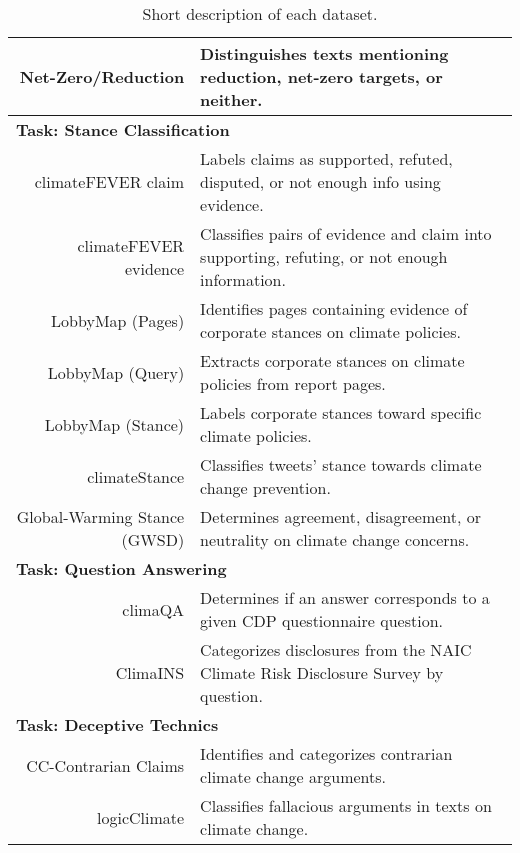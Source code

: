 \begin{table}[htbp]
\begin{tabular}{rp{10cm}}
\hline
Net-Zero/Reduction \cite{tobias_schimanski_climatebert-netzero_2023} &  Distinguishes texts mentioning reduction, net-zero targets, or neither. \\
\hline
\multicolumn{2}{l}{\textbf{Task: Stance Classification}} \\
\hline
climateFEVER claim \cite{diggelmann_climate-fever_2020} &  Labels claims as supported, refuted, disputed, or not enough info using evidence. \\
\hline
climateFEVER evidence \cite{diggelmann_climate-fever_2020} &  Classifies pairs of evidence and claim into supporting, refuting, or not enough information. \\
\hline
LobbyMap (Pages) \cite{morio2023an} &  Identifies pages containing evidence of corporate stances on climate policies. \\
\hline
LobbyMap (Query) \cite{morio2023an} &  Extracts corporate stances on climate policies from report pages. \\
\hline
LobbyMap (Stance) \cite{morio2023an} &  Labels corporate stances toward specific climate policies. \\
\hline
climateStance \cite{vaid-etal-2022-towards} &  Classifies tweets' stance towards climate change prevention. \\
\hline
Global-Warming Stance (GWSD) \cite{luo_detecting_2020} &  Determines agreement, disagreement, or neutrality on climate change concerns. \\
\hline
\multicolumn{2}{l}{\textbf{Task: Question Answering}} \\
\hline
climaQA \cite{spokoyny2023answering} &  Determines if an answer corresponds to a given CDP questionnaire question. \\
\hline
ClimaINS \cite{spokoyny2023answering} &  Categorizes disclosures from the NAIC Climate Risk Disclosure Survey by question. \\
\hline
\multicolumn{2}{l}{\textbf{Task: Deceptive Technics}} \\
\hline
CC-Contrarian Claims \cite{coanComputerassistedClassificationContrarian2021} &  Identifies and categorizes contrarian climate change arguments. \\
\hline
logicClimate \cite{jin-etal-2022-logical} &  Classifies fallacious arguments in texts on climate change. \\
\hline
\hline
\end{tabular}
\caption{Short description of each dataset.}
\label{tab:description_table}
\end{table}
